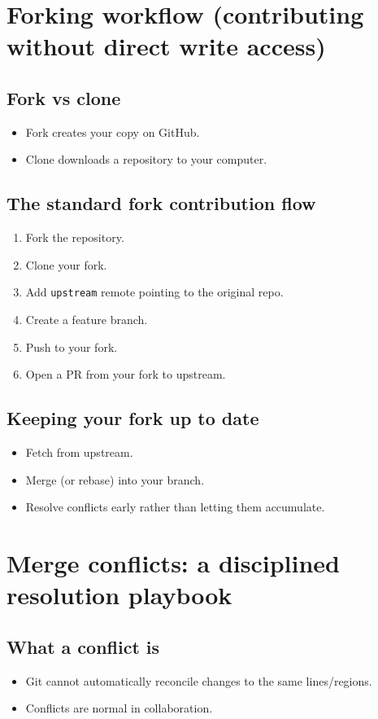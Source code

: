 \section{Forking workflow (contributing without direct write access)}
\subsection{Fork vs clone}
\begin{itemize}
\item Fork creates your copy on GitHub.
\item Clone downloads a repository to your computer.
\end{itemize}

\subsection{The standard fork contribution flow}
\begin{enumerate}
\item Fork the repository.
\item Clone your fork.
\item Add \texttt{upstream} remote pointing to the original repo.
\item Create a feature branch.
\item Push to your fork.
\item Open a PR from your fork to upstream.
\end{enumerate}

\subsection{Keeping your fork up to date}
\begin{itemize}
\item Fetch from upstream.
\item Merge (or rebase) into your branch.
\item Resolve conflicts early rather than letting them accumulate.
\end{itemize}

\section{Merge conflicts: a disciplined resolution playbook}
\subsection{What a conflict is}
\begin{itemize}
\item Git cannot automatically reconcile changes to the same lines/regions.
\item Conflicts are normal in collaboration.
\end{itemize}

